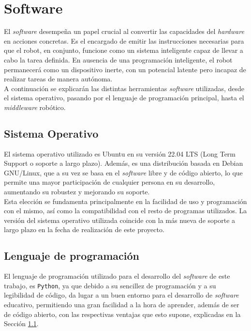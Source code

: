 \section{Software}
\label{sec:software}

El \textit{software} desempeña un papel crucial al convertir las capacidades del
\textit{hardware} en acciones concretas.
Es el encargado de emitir las instrucciones necesarias para que el robot, en
conjunto, funcione como un sistema inteligente capaz de llevar a cabo la tarea
definida.
En ausencia de una programación inteligente, el robot permanecerá como un
dispositivo inerte, con un potencial latente pero incapaz de realizar tareas de
manera autónoma.
\\

A continuación se explicarán las distintas herramientas \textit{software}
utilizadas, desde el sistema operativo, pasando por el lenguaje de programación
principal, hasta el \textit{middleware} robótico.
\\


\subsection{Sistema Operativo}
\label{sec:sistema_operativo}

El sistema operativo utilizado es Ubuntu en su versión 22.04 LTS (Long Term
Support o soporte a largo plazo).
Además, es una distribución basada en Debian GNU/Linux, que a su vez se basa en
el \textit{software} libre y de código abierto, lo que permite una mayor
participación de cualquier persona en su desarrollo, aumentando su robustez y
mejorando su soporte.
\\

Esta elección se fundamenta principalmente en la facilidad de uso y programación
con el mismo, así como la compatibilidad con el resto de programas utilizados.
La versión del sistema operativo utilizada coincide con la más nueva de soporte
a largo plazo en la fecha de realización de este proyecto.
\\


\subsection{Lenguaje de programación}
\label{sec:lenguaje_programacion}

El lenguaje de programación utilizado para el desarrollo del \textit{software}
de este trabajo, es \texttt{Python}, ya que debido a su sencillez de
programación y a su legibilidad de código, da lugar a un buen entorno para el
desarrollo de \textit{software} educativo, permitiendo una gran facilidad a la
hora de aprender, además de ser de código abierto, con las respectivas ventajas
que esto supone, explicadas en la Sección \ref{sec:sistema_operativo}.
\\

